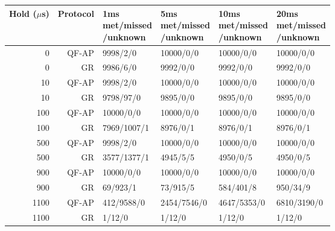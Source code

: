 \begin{tabular}{@{}rrllll@{}}
\toprule
\shortstack{Hold\\($\mu$s)} & Protocol & \shortstack{1ms\\met/missed\\/unknown} & \shortstack{5ms\\met/missed\\/unknown} & \shortstack{10ms\\met/missed\\/unknown} & \shortstack{20ms\\met/missed\\/unknown} \\
\midrule
0 & QF-AP & 9998/2/0 & 10000/0/0 & 10000/0/0 & 10000/0/0 \\
0 & GR & 9986/6/0 & 9992/0/0 & 9992/0/0 & 9992/0/0 \\
10 & QF-AP & 9998/2/0 & 10000/0/0 & 10000/0/0 & 10000/0/0 \\
10 & GR & 9798/97/0 & 9895/0/0 & 9895/0/0 & 9895/0/0 \\
100 & QF-AP & 10000/0/0 & 10000/0/0 & 10000/0/0 & 10000/0/0 \\
100 & GR & 7969/1007/1 & 8976/0/1 & 8976/0/1 & 8976/0/1 \\
500 & QF-AP & 9998/2/0 & 10000/0/0 & 10000/0/0 & 10000/0/0 \\
500 & GR & 3577/1377/1 & 4945/5/5 & 4950/0/5 & 4950/0/5 \\
900 & QF-AP & 10000/0/0 & 10000/0/0 & 10000/0/0 & 10000/0/0 \\
900 & GR & 69/923/1 & 73/915/5 & 584/401/8 & 950/34/9 \\
1100 & QF-AP & 412/9588/0 & 2454/7546/0 & 4647/5353/0 & 6810/3190/0 \\
1100 & GR & 1/12/0 & 1/12/0 & 1/12/0 & 1/12/0 \\
\bottomrule
\end{tabular}

